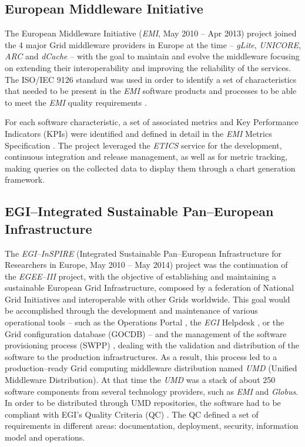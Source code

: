 \subsection{European Middleware Initiative}

The European Middleware Initiative ({\sl EMI}, May 2010 -- Apr 2013)
\cite{cordis:emi} project joined the 4 major Grid middleware providers in
Europe at the time -- {\sl gLite}, {\sl UNICORE}, {\sl ARC} and {\sl dCache} --
with the goal to maintain and evolve the middleware focusing on extending their interoperability and improving the reliability of the services. The
ISO/IEC 9126 \cite{iso-9126} standard was used in order to identify a set of
characteristics that needed to be present in the {\sl EMI} software products and
processes to be able to meet the {\sl EMI} quality requirements
\cite{emi-quality-model}.

For each software characteristic, a set of associated
metrics and Key Performance Indicators (KPIs) were identified and defined in
detail in the {\sl EMI} Metrics Specification \cite{emi-quality-model}. The project
leveraged the {\sl ETICS} service for the development, continuous integration and release management,
as well as for metric tracking, making queries on the collected data to display
them through a chart generation framework.



\subsection{EGI--Integrated Sustainable Pan--European Infrastructure}

The {\sl EGI--InSPIRE} (Integrated Sustainable Pan--European Infrastructure for
Researchers in Europe, May 2010 -- May 2014) project \cite{cordis:egi-inspire}
was the continuation of the {\sl EGEE--III} project, with the objective of establishing and
maintaining a sustainable European Grid Infrastructure, composed by a federation of National
Grid Initiatives and interoperable with other Grids worldwide.
This goal would be accomplished through the
development and maintenance of various operational tools -- such as the Operations Portal \cite{egi-ops},
the {\sl EGI} Helpdesk \cite{ggus}, or the Grid configuration database (GOCDB) \cite{gocdb} -- and the
management of the software provisioning process (SWPP) \cite{mario}, dealing with the validation and distribution of the software to
the production infrastructures. As a result, this process led to a production--ready
Grid computing middleware distribution named {\sl UMD} (Unified Middleware Distribution). At that time the {\sl UMD}
was a stack of about 250 software components from several technology providers, such
as {\sl EMI} and {\sl Globus}. In order to be distributed through UMD
repositories, the software had to be compliant with EGI's Quality Criteria (QC) \cite{egi-qc}. The
QC defined a set of requirements in different areas: documentation, deployment, security, information
model and operations.


